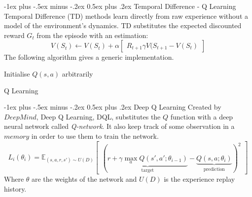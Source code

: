 \documentclass[10pt,landscape]{article}
\makeatletter
\renewcommand{\section}{\@startsection{section}{1}{0mm}%
                                {-1ex plus -.5ex minus -.2ex}%
                                {0.5ex plus .2ex}%
                                {\normalfont\large\bfseries}}
\makeatother
\begin{document}
\begin{multicols}{2}
\section{Temporal Difference - Q Learning}
Temporal Difference (TD) methods learn directly from raw experience without a model of the environment's dynamics. TD substitutes the expected discounted reward $G_t$ from the episode with an estimation:
\begin{equation}
V(S_t) \leftarrow V(S_t) + \alpha \begin{bmatrix}
R_{t + 1} \gamma V(S_{t+1} - V(S_t)
\end{bmatrix}
\end{equation}
The following algorithm gives a generic implementation.
\begin{algorithm}[H]
 Initialise $Q(s,a)$ arbitrarily \\
\caption{Q Learning}
\end{algorithm}
\section{Deep Q Learning}
Created by $DeepMind$, Deep Q Learning, DQL, substitutes the $Q$ function with a deep neural network called \emph{Q-network}. It also keep track of some observation in a $memory$ in order to use them to train the network.
\begin{equation}
L_i(\theta_i) = \mathbb{E}_{(s, a, r, s') \sim U(D)}\begin{bmatrix}
	( \underbrace{r + \gamma \max\limits_a Q(s',a'; \theta_{i-1})}_\text{target} - \underbrace{Q(s,a;\theta_i)}_\text{prediction})^2
\end{bmatrix}
\end{equation}
Where $\theta$ are the weights of the network and $U(D)$ is the experience replay history.


\end{multicols}
\end{document}
